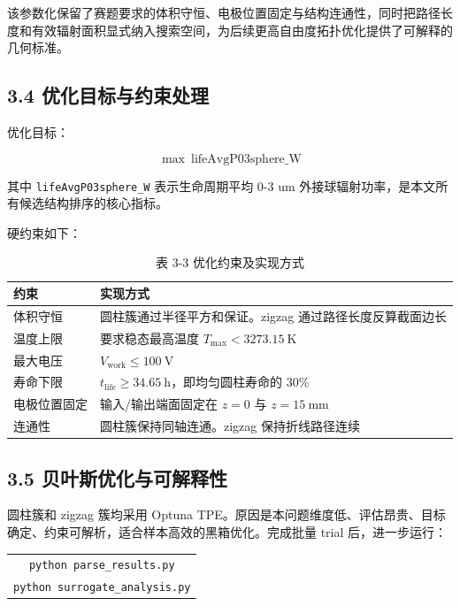 \documentclass[
  a4paper,
]{ctexart}
\begin{document}
该参数化保留了赛题要求的体积守恒、电极位置固定与结构连通性，同时把路径长度和有效辐射面积显式纳入搜索空间，为后续更高自由度拓扑优化提供了可解释的几何标准。

\subsection{3.4
优化目标与约束处理}\label{ux4f18ux5316ux76eeux6807ux4e0eux7ea6ux675fux5904ux7406}

优化目标：

\[
\max\ \mathrm{lifeAvgP03sphere\_W}
\]

其中 \texttt{lifeAvgP03sphere\_W} 表示生命周期平均 0-3 um
外接球辐射功率，是本文所有候选结构排序的核心指标。

硬约束如下：


\begin{table}[H]
\centering
\caption*{表 3-3 优化约束及实现方式}
\small
\begin{tabularx}{0.90\textwidth}{>{\centering\arraybackslash}p{} >{\centering\arraybackslash}X}
\toprule
约束 & 实现方式 \\
\midrule
体积守恒 & 圆柱簇通过半径平方和保证。zigzag 通过路径长度反算截面边长 \\
温度上限 & 要求稳态最高温度 \(T_\mathrm{max}<3273.15\ \mathrm{K}\) \\
最大电压 & \(V_\mathrm{work}\le100\ \mathrm{V}\) \\
寿命下限 & \(t_\mathrm{life}\ge34.65\ \mathrm{h}\)，即均匀圆柱寿命的 30\% \\
电极位置固定 & 输入/输出端面固定在 \(z=0\) 与 \(z=15\ \mathrm{mm}\) \\
连通性 & 圆柱簇保持同轴连通。zigzag 保持折线路径连续 \\
\bottomrule
\end{tabularx}
\end{table}


\subsection{3.5
贝叶斯优化与可解释性}\label{ux8d1dux53f6ux65afux4f18ux5316ux4e0eux53efux89e3ux91caux6027}

圆柱簇和 zigzag 簇均采用 Optuna
TPE。原因是本问题维度低、评估昂贵、目标确定、约束可解析，适合样本高效的黑箱优化。完成批量
trial 后，进一步运行：

\begin{center}
\begin{tabular}{c}
\texttt{python parse\_results.py} \\
\texttt{python surrogate\_analysis.py}
\end{tabular}
\end{center}
\end{document}
